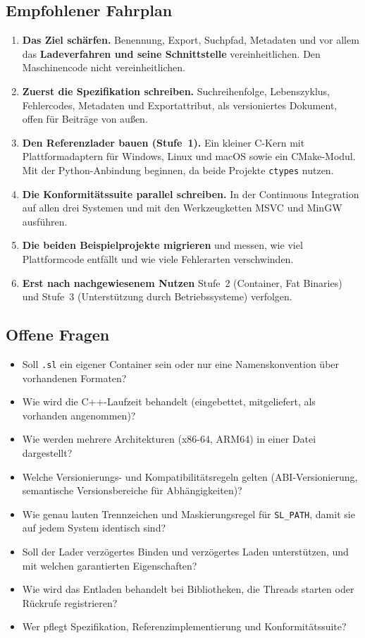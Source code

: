 \subsection{Empfohlener Fahrplan}

\begin{enumerate}
	\item \textbf{Das Ziel schärfen.} Benennung, Export, Suchpfad, Metadaten und vor allem das \textbf{Ladeverfahren und seine Schnittstelle} vereinheitlichen. Den Maschinencode nicht vereinheitlichen.
	\item \textbf{Zuerst die Spezifikation schreiben.} Suchreihenfolge, Lebenszyklus, Fehlercodes, Metadaten und Exportattribut, als versioniertes Dokument, offen für Beiträge von außen.
	\item \textbf{Den Referenzlader bauen (Stufe~1).} Ein kleiner C-Kern mit Plattformadaptern für Windows, Linux und macOS sowie ein CMake-Modul. Mit der Python-Anbindung beginnen, da beide Projekte \texttt{ctypes} nutzen.
	\item \textbf{Die Konformitätssuite parallel schreiben.} In der Continuous Integration auf allen drei Systemen und mit den Werkzeugketten MSVC und MinGW ausführen.
	\item \textbf{Die beiden Beispielprojekte migrieren} und messen, wie viel Plattformcode entfällt und wie viele Fehlerarten verschwinden.
	\item \textbf{Erst nach nachgewiesenem Nutzen} Stufe~2 (Container, Fat Binaries) und Stufe~3 (Unterstützung durch Betriebssysteme) verfolgen.
\end{enumerate}

\subsection{Offene Fragen}
\label{sec:sl_offen}

\begin{itemize}
	\item Soll \texttt{.sl} ein eigener Container sein oder nur eine Namenskonvention über vorhandenen Formaten?
	\item Wie wird die C++-Laufzeit behandelt (eingebettet, mitgeliefert, als vorhanden angenommen)?
	\item Wie werden mehrere Architekturen (x86-64, ARM64) in einer Datei dargestellt?
	\item Welche Versionierungs- und Kompatibilitätsregeln gelten (ABI-Versionierung, semantische Versionsbereiche für Abhängigkeiten)?
	\item Wie genau lauten Trennzeichen und Maskierungsregel für \texttt{SL\_PATH}, damit sie auf jedem System identisch sind?
	\item Soll der Lader verzögertes Binden und verzögertes Laden unterstützen, und mit welchen garantierten Eigenschaften?
	\item Wie wird das Entladen behandelt bei Bibliotheken, die Threads starten oder Rückrufe registrieren?
	\item Wer pflegt Spezifikation, Referenzimplementierung und Konformitätssuite?
\end{itemize}

